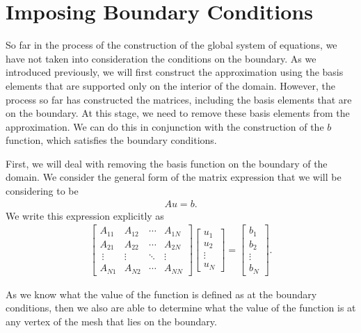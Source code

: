 \documentclass[../fem.tex]{subfile}
\begin{document}
\section{Imposing Boundary Conditions}%
\label{sec:imposing_boundary_conditions}

So far in the process of the construction of the global system of equations, we
have not taken into consideration the conditions on the boundary. As we
introduced previously, we will first construct the approximation using the
basis elements that are supported only on the interior of the domain. However,
the process so far has constructed the matrices, including the basis elements
that are on the boundary. At this stage, we need to remove these basis elements
from the approximation. We can do this in conjunction with the construction of
the $b$ function, which satisfies the boundary conditions.

First, we will deal with removing the basis function on the boundary of the
domain. We consider the general form of the matrix expression that we will be
considering to be
\begin{align*}
   Au=b.
\end{align*}
We write this expression explicitly as
\begin{align*}
   \begin{bmatrix}
     A_{11} & A_{12} & \cdots & A_{1N}\\
     A_{21} & A_{22} & \cdots & A_{2N}\\\
     \vdots & \vdots & \ddots & \vdots\\
     A_{N1} & A_{N2} & \cdots & A_{NN}
   \end{bmatrix}
   \begin{bmatrix}
      u_1\\u_2\\\vdots\\u_N
   \end{bmatrix}=
   \begin{bmatrix}
      b_1\\b_2\\\vdots\\b_N
   \end{bmatrix}.
\end{align*}

As we know what the value of the function is defined as at the boundary
conditions, then we also are able to determine what the value of the function
is at any vertex of the mesh that lies on the boundary.
\end{document}
